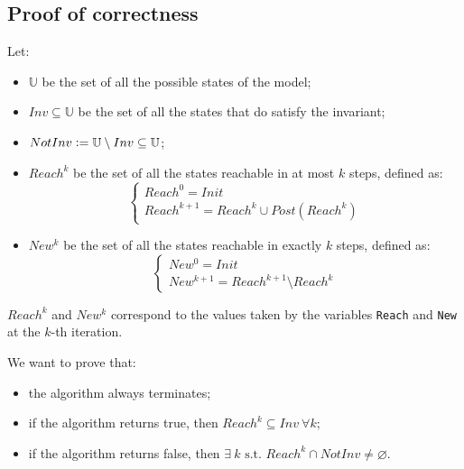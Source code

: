 \documentclass[12pt]{article}
\begin{document}
    \subsection{Proof of correctness}
    Let:
    \begin{itemize}
        \item $\mathbb U$ be the set of all the possible states of the model;
        \item $Inv \subseteq \mathbb U$ be the set of all the states that do satisfy the invariant;
        \item $NotInv \vcentcolon= \mathbb U \setminus Inv \subseteq \mathbb U$;
        \item $Reach^k$ be the set of all the states reachable in at most $k$ steps, defined as:
        $$
            \begin{cases}
                Reach^0 = Init \\
                Reach^{k + 1} = Reach^k \cup Post(Reach^k)
            \end{cases}
        $$
        \item $New^k$ be the set of all the states reachable in exactly $k$ steps, defined as:
        $$
            \begin{cases}
                New^0 = Init \\
                New^{k + 1} = Reach^{k+1} \setminus Reach^k
            \end{cases}
        $$
    \end{itemize}
    $Reach^k$ and $New^k$ correspond to the values taken by the variables \texttt{Reach} and \texttt{New} at the $k$-th iteration.
    
    \noindent
    We want to prove that:
    \begin{itemize}
        \item the algorithm always terminates;
        \item if the algorithm returns true, then $Reach^k \subseteq Inv\ \forall k$;
        \item if the algorithm returns false, then $\exists\ k \mbox{ s.t. } Reach^k \cap NotInv \neq \varnothing$.
    \end{itemize}

\end{document}
